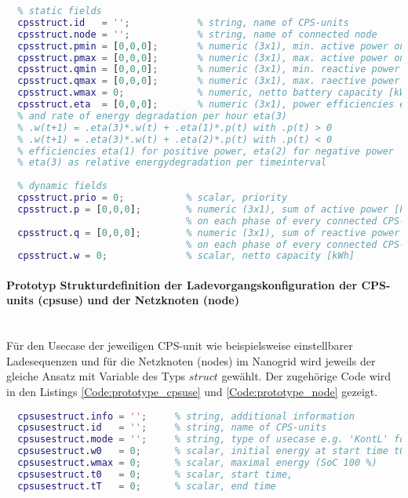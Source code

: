             
	          \begin{lstlisting}[language=Matlab,caption=Funktion zur Strukturdefinition der CPS-units, label=Code:prototype_cps]
  % CPS STRUCTURE (consumer-producer-storage)
  % static fields
  cpsstruct.id   = '';            % string, name of CPS-units
  cpsstruct.node = '';            % string, name of connected node
  cpsstruct.pmin = [0,0,0];       % numeric (3x1), min. active power on phases [kW]
  cpsstruct.pmax = [0,0,0];       % numeric (3x1), max. active power on phases [kW]
  cpsstruct.qmin = [0,0,0];       % numeric (3x1), min. reactive power on phases [kvar]
  cpsstruct.qmax = [0,0,0];       % numeric (3x1), max. raective power on phases [kvar]
  cpsstruct.wmax = 0;             % numeric, netto battery capacity [kWh]
  cpsstruct.eta  = [0,0,0];       % numeric (3x1), power efficiencies eta(1), eta(2) 
  % and rate of energy degradation per hour eta(3) 
  % .w(t+1) = .eta(3)*.w(t) + .eta(1)*.p(t) with .p(t) > 0
  % .w(t+1) = .eta(3)*.w(t) + .eta(2)*.p(t) with .p(t) < 0 
  % efficiencies eta(1) for positive power, eta(2) for negative power
  % eta(3) as relative energydegradation per timeinterval
  
  % dynamic fields
  cpsstruct.prio = 0;           % scalar, priority
  cpsstruct.p = [0,0,0];        % numeric (3x1), sum of active power [kW]
                                % on each phase of every connected CPS-unit
  cpsstruct.q = [0,0,0];        % numeric (3x1), sum of reactive power [kW]
                                % on each phase of every connected CPS-unit
  cpsstruct.w = 0;              % scalar, netto capacity [kWh]
    	      \end{lstlisting}
			
			\paragraph{Prototyp Strukturdefinition der Ladevorgangskonfiguration der CPS-units (cpsuse) und der Netzknoten (node)} ~\\
             Für den Usecase der jeweiligen CPS-unit wie beispielsweise einstellbarer Ladesequenzen und für die Netzknoten (nodes) im Nanogrid wird jeweils der gleiche Ansatz mit Variable des Typs $struct$ gewählt. Der zugehörige Code wird in den Listings \ref{Code:prototype_cpsuse} und \ref{Code:prototype_node} gezeigt. \\
            

          \begin{lstlisting}[language=Matlab,caption=Funktion zur Strukturdefinition der CPS-Unit zugehörigen Usecases, label=Code:prototype_cpsuse]
  % CPSUSE STRUCTURE
  cpsusestruct.info = '';     % string, additional information
  cpsusestruct.id   = '';     % string, name of CPS-units
  cpsusestruct.mode = '';     % string, type of usecase e.g. 'KontL' for continuously charging
  cpsusestruct.w0   = 0;      % scalar, initial energy at start time t0
  cpsusestruct.wmax = 0;      % scalar, maximal energy (SoC 100 %)
  cpsusestruct.t0   = 0;      % scalar, start time, 
  cpsusestruct.tT   = 0;      % scalar, end time
          \end{lstlisting}			

